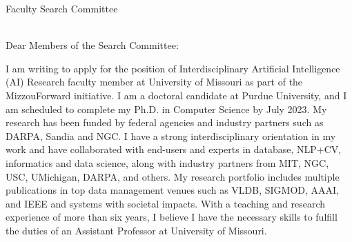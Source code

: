\documentclass[11pt]{article}
\begin{document}
\thispagestyle{plain}

\pagestyle{empty}

Faculty Search Committee \\
\InstitutionName \\
\DepartmentAddress

Dear Members of the Search Committee:

I am writing to apply for the position of Interdisciplinary Artificial Intelligence (AI) Research faculty member at University of Missouri as part of the MizzouForward initiative.
I am a doctoral candidate at Purdue University, and I am scheduled to complete my Ph.D. in Computer Science by July 2023. My research has been funded by federal agencies and industry partners such as DARPA, Sandia and NGC. I have a strong interdisciplinary orientation in my work and have collaborated with end-users and experts in database, NLP+CV, informatics and data science, along with industry partners from MIT, NGC, USC, UMichigan, DARPA, and others. My research portfolio includes multiple publications in top data management venues such as VLDB, SIGMOD, AAAI, and IEEE and systems with societal impacts. With a teaching and research experience of more than six years, I believe I have the necessary skills to fulfill the duties of an Assistant Professor at University of Missouri.
 
\end{document}
